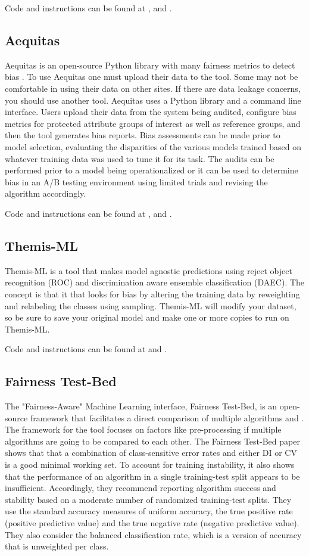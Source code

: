 \documentclass[conference]{IEEEtran}
\begin{document}
Code and instructions can be found at \cite{b38}, \cite{b39} and \cite{b40}.

\subsection{Aequitas}
Aequitas is an open-source Python library with many fairness metrics to detect bias \cite{b41}.
To use Aequitas one must upload their data to the tool. Some may not be comfortable in using their data on other sites. If there are data leakage concerns, you should use another tool. 
Aequitas uses a Python library and a command line interface. Users upload their data from the system being audited, configure bias metrics for protected attribute groups of interest as well as reference groups, and then the tool generates bias reports. Bias assessments can be made prior to model selection, evaluating the disparities of the various models trained based on whatever training data was used to tune it for its task. The audits can be performed prior to a model being operationalized or it can be used to determine bias in an A/B testing environment using limited trials and revising the algorithm accordingly.

Code and instructions can be found at \cite{b42}, \cite{b43} and \cite{b44}.

\subsection{Themis-ML}
Themis-ML is a tool that makes model agnostic predictions using reject object recognition (ROC) and discrimination aware ensemble classification (DAEC). The concept is that it that looks for bias by altering the training data by reweighting and relabeling the classes using sampling.
Themis-ML will modify your dataset, so be sure to save your original model and make one or more copies to run on Themis-ML. \cite{b45}

Code and instructions can be found at \cite{b46} and \cite{b47}.

\subsection{Fairness Test-Bed}
The "Fairness-Aware" Machine Learning interface, Fairness Test-Bed, is an open-source framework that facilitates a direct comparison of multiple algorithms \cite{b48} and \cite{b49}.
The framework for the tool focuses on factors like pre-processing if multiple algorithms are going to be compared to each other. The Fairness Test-Bed paper shows that that a combination of class-sensitive error rates and either DI or CV is a good minimal working set. To account for training instability, it also shows that the performance of an algorithm in a single training-test split appears to be insufficient. Accordingly, they recommend reporting algorithm success and stability based on a moderate number of randomized training-test splits.
They use the standard accuracy measures of uniform accuracy, the true positive rate (positive predictive value) and the true negative rate (negative predictive value). They also consider the balanced classification rate, which is a version of accuracy that is unweighted per class.
\end{document}
